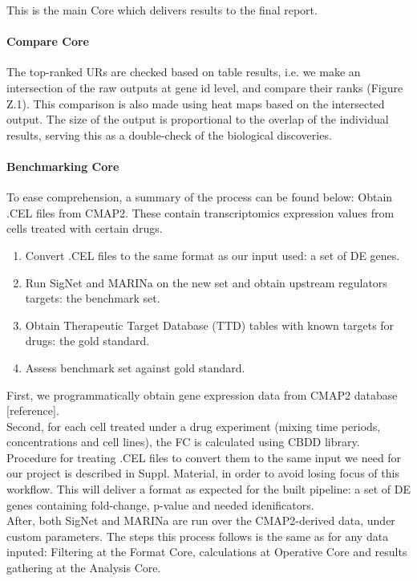 This is the main Core which delivers results to the final report.

\paragraph{Compare Core}
The top-ranked URs are checked based on table results, i.e. we make an intersection of the raw outputs at gene id level, and compare their ranks (Figure Z.1). This comparison is also made using heat maps based on the intersected output.
The size of the output is proportional to the overlap of the individual results, serving this as a double-check of the biological discoveries.

\paragraph{Benchmarking Core}
To ease comprehension, a summary of the process can be found below:
Obtain .CEL files from CMAP2. These contain transcriptomics expression values from cells treated with certain drugs.
\begin{enumerate}
    \item Convert .CEL files to the same format as our input used: a set of DE genes.
    \item Run SigNet and MARINa on the new set and obtain upstream regulators targets: the benchmark set.
    \item Obtain Therapeutic Target Database (TTD) tables with known targets for drugs: the gold standard.
    \item Assess benchmark set against gold standard.
\end{enumerate}

First, we programmatically obtain gene expression data from CMAP2 database [reference]. 
\\

Second, for each cell treated under a drug experiment (mixing time periods, concentrations and cell lines), the FC is calculated using CBDD library. Procedure for treating .CEL files to convert them to the same input we need for our project is described in Suppl. Material, in order to avoid losing focus of this workflow. This will deliver a format as expected for the built pipeline: a set of DE genes containing fold-change, p-value and needed idenificators.
\\

After, both SigNet and MARINa are run over the CMAP2-derived data, under custom parameters. The steps this process follows is the same as for any data inputed:
Filtering at the Format Core, calculations at Operative Core and results gathering at the Analysis Core.
\\

